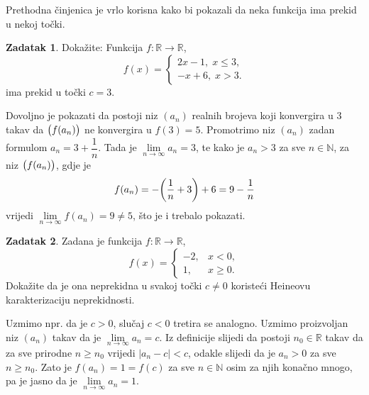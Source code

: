 \documentclass{book}
\let\originalleft\left
\let\originalright\right
\renewcommand{\left}{\mathopen{}\mathclose\bgroup\originalleft}
\renewcommand{\right}{\aftergroup\egroup\originalright}
\renewenvironment{proof}{%
    \vspace{-\parskip}\begin{oldproof}%
    }{%
    \end{oldproof}%
}
\theoremstyle{definition}
\theoremstyle{definition}
\newtheorem{exercise}{Zadatak}
\theoremstyle{remark}
\begin{document}
Prethodna činjenica je vrlo korisna kako bi pokazali da neka funkcija ima prekid u nekoj točki.
\begin{exercise} Dokažite: Funkcija $f : \mathbb{R}\to \mathbb{R}$, $$f(x)=\begin{cases}
2x-1,\; x\leq 3,\\
-x+6,\; x>3.
\end{cases}$$
ima prekid u točki $c=3$.
\end{exercise}
\begin{proof}[Rješenje]
Dovoljno je pokazati da postoji niz $(a_n)$ realnih brojeva koji konvergira u $3$ takav da $\left(f(a_n)\right)$ ne konvergira u $f(3)=5$. Promotrimo niz $(a_n)$ zadan formulom $a_n=3+\dfrac{1}{n}$. Tada je $\lim\limits_{n\to \infty}{a_n}=3$, te kako je $a_n>3$ za sve $n\in \mathbb{N}$, za niz $\left(f(a_n)\right)$, gdje je
$$f(a_n)=-\left(\dfrac{1}{n}+3\right)+6=9-\dfrac{1}{n}$$
vrijedi $\lim\limits_{n\to \infty}{f(a_n)}=9\neq 5$, što je i trebalo pokazati.
\end{proof}
\begin{exercise}
Zadana je funkcija $f : \mathbb{R}\to \mathbb{R}$,
$$f(x)=\begin{cases}
-2, & x<0,\\
1, & x\geq 0.
\end{cases}$$
Dokažite da je ona neprekidna u svakoj točki $c\neq 0$ koristeći Heineovu karakterizaciju neprekidnosti.
\end{exercise}
\begin{proof}
Uzmimo npr. da je $c>0$, slučaj $c<0$ tretira se analogno. Uzmimo proizvoljan niz $(a_n)$ takav da je $\lim\limits_{n\to \infty}{a_n}=c$. Iz definicije slijedi da postoji $n_0\in \mathbb{R}$ takav da za sve prirodne $n\geq n_0$ vrijedi $|a_n-c|<c$, odakle slijedi da je $a_n>0$ za sve $n\geq n_0$. Zato je $f(a_n)=1=f(c)$ za sve $n\in \mathbb{N}$ osim za njih konačno mnogo, pa je jasno da je $\lim\limits_{n\to \infty}{a_n}=1$.
\end{proof}
\end{document}
